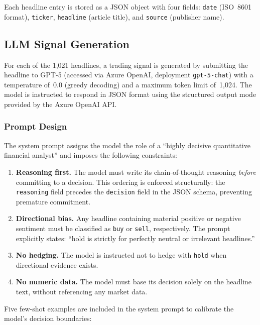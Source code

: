Each headline entry is stored as a JSON object with four fields:
\texttt{date} (ISO~8601 format), \texttt{ticker}, \texttt{headline} (article
title), and \texttt{source} (publisher name).

\subsection{LLM Signal Generation} \label{sec:signal_generation}

For each of the 1{,}021 headlines, a trading signal is generated by submitting
the headline to GPT-5 (accessed via Azure OpenAI, deployment
\texttt{gpt-5-chat}) with a temperature of~0.0 (greedy decoding) and a maximum
token limit of~1{,}024. The model is instructed to respond in JSON format using
the structured output mode provided by the Azure OpenAI API.

\subsubsection{Prompt Design}

The system prompt assigns the model the role of a ``highly decisive quantitative
financial analyst'' and imposes the following constraints:

\begin{enumerate}
    \item \textbf{Reasoning first.} The model must write its chain-of-thought
    reasoning \textit{before} committing to a decision. This ordering is
    enforced structurally: the \texttt{reasoning} field precedes the
    \texttt{decision} field in the JSON schema, preventing premature commitment.
    \item \textbf{Directional bias.} Any headline containing material positive
    or negative sentiment must be classified as \texttt{buy} or \texttt{sell},
    respectively. The prompt explicitly states: ``hold is strictly for perfectly
    neutral or irrelevant headlines.''
    \item \textbf{No hedging.} The model is instructed not to hedge with
    \texttt{hold} when directional evidence exists.
    \item \textbf{No numeric data.} The model must base its decision solely on
    the headline text, without referencing any market data.
\end{enumerate}

Five few-shot examples are included in the system prompt to calibrate the
model's decision boundaries:


